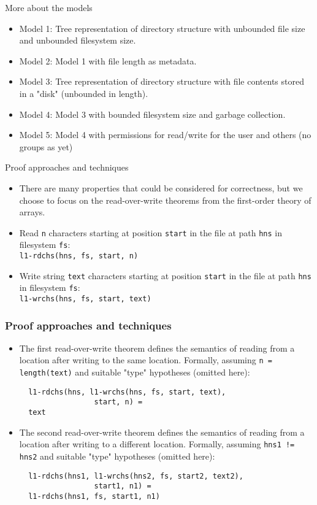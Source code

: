 \documentclass{beamer}
\begin{document}
\begin{frame}{More about the models}
  \begin{itemize}
  \item Model 1: Tree representation of directory structure with unbounded
    file size and unbounded filesystem size.
  \item Model 2: Model 1 with file length as metadata.
  \item Model 3: Tree representation of directory structure with
    file contents stored in a "disk" (unbounded in length).
  \item Model 4: Model 3 with bounded filesystem size and garbage
    collection.
  \item Model 5: Model 4 with permissions for read/write for the user
    and others (no groups as yet)
  \end{itemize}
\end{frame}

\begin{frame}{Proof approaches and techniques}
  \begin{itemize}
  \item There are many properties that could be considered for
    correctness, but we choose to focus on the read-over-write
    theorems from the first-order theory of arrays.
  \item Read \texttt{n} characters starting at position \texttt{start}
    in the file at path \texttt{hns} in filesystem \texttt{fs}: \\
    \texttt{l1-rdchs(hns, fs, start, n)}
  \item Write string \texttt{text} characters starting at position \texttt{start}
    in the file at path \texttt{hns} in filesystem \texttt{fs}: \\
    \texttt{l1-wrchs(hns, fs, start, text)}
  \end{itemize}
\end{frame}
\begin{frame}[fragile]
  \frametitle{Proof approaches and techniques}
  \begin{itemize}
  \item The first read-over-write theorem defines the semantics of
    reading from a location after writing to the same
    location. Formally, assuming \texttt{n =
      length(text)} and suitable "type" hypotheses (omitted here): \\
\begin{verbatim}
  l1-rdchs(hns, l1-wrchs(hns, fs, start, text),
                 start, n) =
  text
\end{verbatim}
  \item The second read-over-write theorem defines the semantics of
    reading from a location after writing to a different
    location. Formally, assuming \texttt{hns1 != hns2} and suitable "type"
    hypotheses (omitted here):\\
\begin{verbatim}
  l1-rdchs(hns1, l1-wrchs(hns2, fs, start2, text2),
                 start1, n1) =
  l1-rdchs(hns1, fs, start1, n1)
\end{verbatim}
  \end{itemize}
\end{frame}
\end{document}
